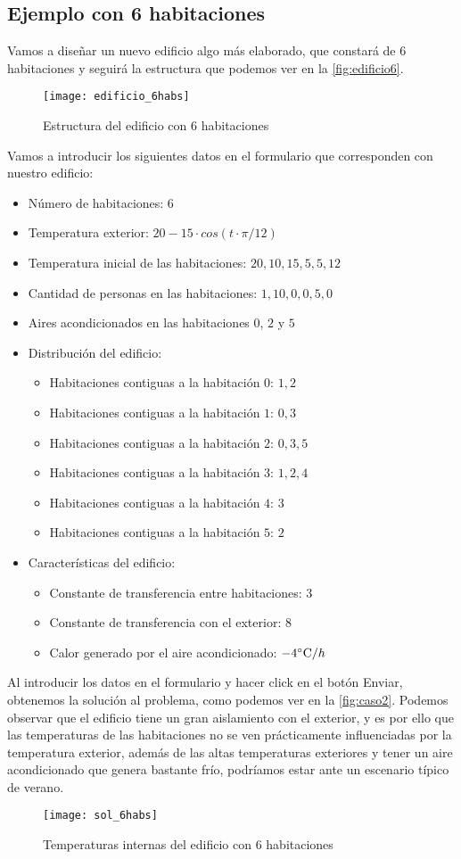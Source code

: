 \subsection{Ejemplo con 6 habitaciones}
Vamos a diseñar un nuevo edificio algo más elaborado, que constará de 6 habitaciones y seguirá la estructura que podemos ver en la \autoref{fig:edificio6}.
\begin{figure}[h!]
	\centering
	\texttt{[image: edificio\_6habs]}
	\caption{Estructura del edificio con 6 habitaciones}
	\label{fig:edificio6}
\end{figure}
Vamos a introducir los siguientes datos en el formulario que corresponden con nuestro edificio:
\begin{itemize}
	\item Número de habitaciones: $6$
	\item Temperatura exterior: $20 - 15\cdot cos(t\cdot \pi/12)$
	\item Temperatura inicial de las habitaciones: $20,10,15,5,5,12$
	\item Cantidad de personas en las habitaciones: $1,10,0,0,5,0$
	\item Aires acondicionados en las habitaciones $0$, $2$ y $5$
	\item Distribución del edificio: 
	\begin{itemize}
		\item Habitaciones contiguas a la habitación $0$: $1,2$
		\item Habitaciones contiguas a la habitación $1$: $0,3$
		\item Habitaciones contiguas a la habitación $2$: $0,3,5$
		\item Habitaciones contiguas a la habitación $3$: $1,2,4$
		\item Habitaciones contiguas a la habitación $4$: $3$
		\item Habitaciones contiguas a la habitación $5$: $2$
	\end{itemize}
	\item Características del edificio:
	\begin{itemize}
		\item Constante de transferencia entre habitaciones: $3$
		\item Constante de transferencia con el exterior: $8$
		\item Calor generado por el aire acondicionado: $-4\celsius / h$
	\end{itemize}
\end{itemize}
Al introducir los datos en el formulario y hacer click en el botón Enviar, obtenemos la solución al problema, como podemos ver en la \autoref{fig:caso2}. Podemos observar que el edificio tiene un gran aislamiento con el exterior, y es por ello que las temperaturas de las habitaciones no se ven prácticamente influenciadas por la temperatura exterior, además de las altas temperaturas exteriores y tener un aire acondicionado que genera bastante frío, podríamos estar ante un escenario típico de verano.
\begin{figure}[h!]
	\centering
	\texttt{[image: sol\_6habs]}
	\caption{Temperaturas internas del edificio con 6 habitaciones}
	\label{fig:caso2}
\end{figure}

